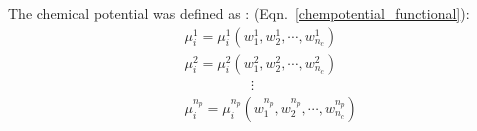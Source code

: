 \documentclass[12pt,a4paper,oneside]{report}%
\begin{document}


The chemical potential was defined as : (Eqn.~\ref{chempotential_functional}):
\begin{eqnarray}
&& \mu_{i}^{1} = \mu_{i}^{1}\left(w_{1}^{1},w_{2}^{1},\cdots,w_{n_{c}}^{1}\right) \nonumber \\
&& \mu_{i}^{2} = \mu_{i}^{2}\left(w_{1}^{2},w_{2}^{2},\cdots,w_{n_{c}}^{2}\right) \nonumber \\
&& \hspace{2cm}\vdots \nonumber \\
&& \mu_{i}^{n_{p}} = \mu_{i}^{n_{p}}\left(w_{1}^{n_{p}},w_{2}^{n_{p}},\cdots,w_{n_{c}}^{n_{p}}\right) \label{ChemPotDef2}
\end{eqnarray}
\end{document}
